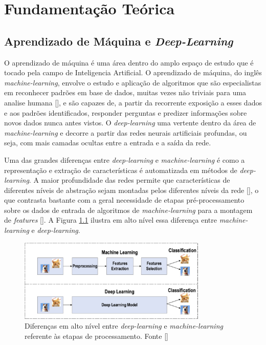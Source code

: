 \chapter{Fundamentação Teórica}


\section{Aprendizado de Máquina e \textit{Deep-Learning}}
O aprendizado de máquina é uma área dentro do amplo espaço de estudo que é tocado pela campo de Inteligencia Artificial. O aprendizado de máquina, do inglês \textit{machine-learning}, envolve o estudo e aplicação de algoritmos que são especialistas em reconhecer padrões em base de dados, muitas vezes não triviais para uma analise humana [], e são capazes de, a partir da recorrente exposição a esses dados e aos padrões identificados, responder perguntas e predizer informações sobre novos dados nunca antes vistos. O \textit{deep-learning} uma vertente dentro da área de \textit{machine-learning} e decorre a partir das redes neurais artificiais profundas, ou seja, com mais camadas ocultas entre a entrada e a saída da rede.

Uma das grandes diferenças entre \textit{deep-learning} e \textit{machine-learning} é como a representação e extração de características é automatizada em métodos de \textit{deep-learning}. A maior profundidade das redes permite que características de diferentes níveis de abstração sejam montadas pelos diferentes níveis da rede [], o que contrasta bastante com a geral necessidade de etapas pré-processamento sobre os dados de entrada de algoritmos de \textit{machine-learning} para a montagem de \textit{features} []. A Figura \ref{fig:dl_vs_ml} ilustra em alto nível essa diferença entre \textit{machine-learning} e \textit{deep-learning}.

\begin{figure}
    \centering
    \includegraphics[width=0.8\textwidth]{figs/theory-ml-vs-dl.png}
    \caption{Diferenças em alto nível entre \textit{deep-learning} e \textit{machine-learning} referente às etapas de processamento. Fonte []}
    \label{fig:dl_vs_ml}
\end{figure}

